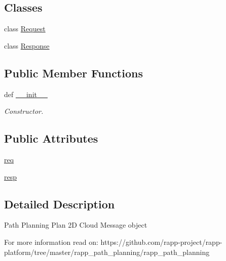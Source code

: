 \subsection*{Classes}
\begin{DoxyCompactItemize}
\item 
class \hyperlink{classRappCloud_1_1CloudMsgs_1_1PathPlanningPlan2D_1_1PathPlanningPlan2D_1_1Request}{Request}
\item 
class \hyperlink{classRappCloud_1_1CloudMsgs_1_1PathPlanningPlan2D_1_1PathPlanningPlan2D_1_1Response}{Response}
\end{DoxyCompactItemize}
\subsection*{Public Member Functions}
\begin{DoxyCompactItemize}
\item 
def \hyperlink{classRappCloud_1_1CloudMsgs_1_1PathPlanningPlan2D_1_1PathPlanningPlan2D_a69045d837c1d7fa3637c474eb5449128}{\-\_\-\-\_\-init\-\_\-\-\_\-}
\begin{DoxyCompactList}\small\item\em Constructor. \end{DoxyCompactList}\end{DoxyCompactItemize}
\subsection*{Public Attributes}
\begin{DoxyCompactItemize}
\item 
\hyperlink{classRappCloud_1_1CloudMsgs_1_1PathPlanningPlan2D_1_1PathPlanningPlan2D_a73b28f027f8ef617a8298e46058cddc3}{req}
\item 
\hyperlink{classRappCloud_1_1CloudMsgs_1_1PathPlanningPlan2D_1_1PathPlanningPlan2D_a2ad21c77dcd6400ad3658dfaa548377d}{resp}
\end{DoxyCompactItemize}


\subsection{Detailed Description}
\begin{DoxyVerb}Path Planning Plan 2D Cloud Message object

For more information read on:
    https://github.com/rapp-project/rapp-platform/tree/master/rapp_path_planning/rapp_path_planning
\end{DoxyVerb}
 

